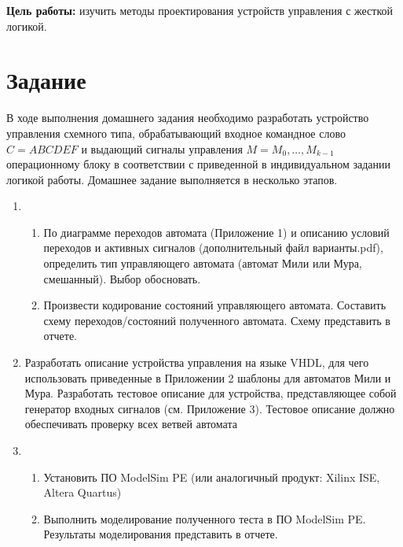 \documentclass[a4paper, 14pt]{article}
\begin{document}
    \graphicspath{{images/}{images2/}} %
    \renewcommand{\figurename}{Рисунок}

    \author{М.А.Гейне}
    \bmstutitlehome

    \textbf{Цель работы:} изучить методы проектирования устройств управления с жесткой логикой.
    \section*{Задание}
    В ходе выполнения домашнего задания необходимо разработать устройство
    управления схемного типа, обрабатывающий входное командное слово
    $ C ={ABCDEF}$ и выдающий сигналы управления $M={M_0,…,M_{k-1}}$
    операционному блоку в соответствии с приведенной в индивидуальном задании
    логикой работы.
    Домашнее задание выполняется в несколько этапов.

    \renewcommand{\labelenumii}{\Alph{enumii}}
    \begin{enumerate}
        \item \begin{enumerate}
            \item По диаграмме переходов автомата (Приложение 1) и описанию условий
            переходов и активных сигналов (дополнительный файл варианты.pdf),
            определить тип управляющего автомата (автомат Мили или Мура, смешанный).
            Выбор обосновать.
            \item Произвести кодирование состояний управляющего автомата. Составить схему
            переходов/состояний полученного автомата. Схему представить в отчете. 
        \end{enumerate} 
        \item Разработать описание устройства управления на языке VHDL, для чего
        использовать приведенные в Приложении 2 шаблоны для автоматов Мили и
        Мура.
        Разработать тестовое описание для устройства, представляющее собой
        генератор входных сигналов (см. Приложение 3). Тестовое описание должно
        обеспечивать проверку всех ветвей автомата
        \item \begin{enumerate}
            \item Установить ПО ModelSim PE (или аналогичный продукт: Xilinx ISE, Altera
            Quartus)
            \item Выполнить моделирование полученного теста в ПО ModelSim PE. Результаты
            моделирования представить в отчете.
        \end{enumerate}
    \end{enumerate}
\end{document}
